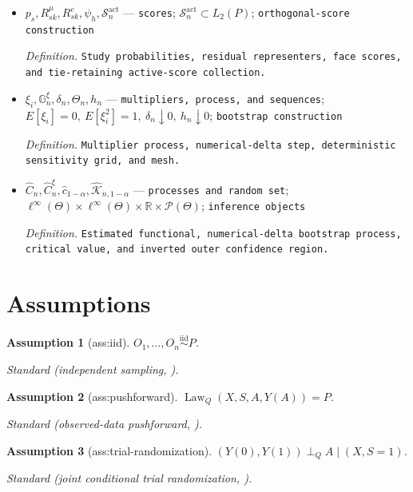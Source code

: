 \documentclass{article}
\newtheorem{assumption}{Assumption}
\begin{document}
\begin{itemize}
  \item \(p_s,R^\mu_{sk},R^e_{sk},\psi_h,\mathcal S_n^{\mathrm{act}}\) --- \texttt{scores}; \(\mathcal S_n^{\mathrm{act}}\subset L_2(P)\); \texttt{orthogonal-\allowbreak{}score construction}
  \par\smallskip\noindent\emph{Definition.} \texttt{Study probabilities,\allowbreak{} residual representers,\allowbreak{} face scores,\allowbreak{} and tie-\allowbreak{}retaining active-\allowbreak{}score collection.}
  \item \(\xi_i,\mathbb G_n^\xi,\delta_n,\Theta_n,h_n\) --- \texttt{multipliers,\allowbreak{} process,\allowbreak{} and sequences}; \(E[\xi_i]=0,\ E[\xi_i^2]=1,\ \delta_n\downarrow0,\ h_n\downarrow0\); \texttt{bootstrap construction}
  \par\smallskip\noindent\emph{Definition.} \texttt{Multiplier process,\allowbreak{} numerical-\allowbreak{}delta step,\allowbreak{} deterministic sensitivity grid,\allowbreak{} and mesh.}
  \item \(\widehat C_n,\widehat C_n^\xi,\widehat c_{1-\alpha},\widehat{\mathcal K}_{n,1-\alpha}\) --- \texttt{processes and random set}; \(\ell^\infty(\Theta)\times\ell^\infty(\Theta)\times\mathbb R\times\mathcal P(\Theta)\); \texttt{inference objects}
  \par\smallskip\noindent\emph{Definition.} \texttt{Estimated functional,\allowbreak{} numerical-\allowbreak{}delta bootstrap process,\allowbreak{} critical value,\allowbreak{} and inverted outer confidence region.}
\end{itemize}

\section{Assumptions}

\begin{assumption}[ass:iid]\label{ass:iid}
\(O_1,\ldots,O_n\stackrel{\mathrm{iid}}{\sim}P\).
\par\smallskip\noindent\emph{Standard} (independent sampling, \cite{ChernozhukovEtAl2018DML}).
\end{assumption}

\begin{assumption}[ass:pushforward]\label{ass:pushforward}
\(\operatorname{Law}_Q(X,S,A,Y(A))=P\).
\par\smallskip\noindent\emph{Standard} (observed-data pushforward, \cite{Kallenberg2002}).
\end{assumption}

\begin{assumption}[ass:trial-randomization]\label{ass:trial-randomization}
\((Y(0),Y(1))\perp_Q A\mid(X,S=1)\).
\par\smallskip\noindent\emph{Standard} (joint conditional trial randomization, \cite{LannersRudinVolfovskyParikh2025}).
\end{assumption}
\end{document}
